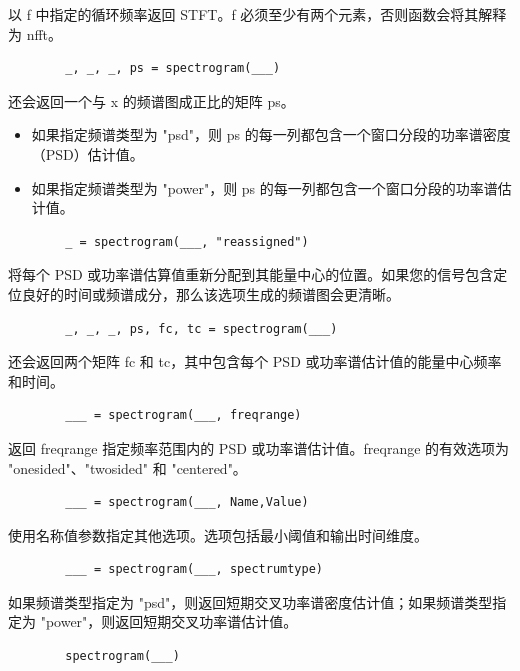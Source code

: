 \documentclass{article}
\begin{document}
	以 f 中指定的循环频率返回 STFT。f 必须至少有两个元素，否则函数会将其解释为 nfft。
	
	\begin{verbatim}
		_, _, _, ps = spectrogram(___)
	\end{verbatim}
	
	还会返回一个与 x 的频谱图成正比的矩阵 ps。
	
	\begin{itemize}
		\item 如果指定频谱类型为 "psd"，则 ps 的每一列都包含一个窗口分段的功率谱密度（PSD）估计值。
		
		\item 如果指定频谱类型为 "power"，则 ps 的每一列都包含一个窗口分段的功率谱估计值。
	\end{itemize}	
	
	
	\begin{verbatim}
		_ = spectrogram(___, "reassigned")
	\end{verbatim}
	
	将每个 PSD 或功率谱估算值重新分配到其能量中心的位置。如果您的信号包含定位良好的时间或频谱成分，那么该选项生成的频谱图会更清晰。
	
	\begin{verbatim}
		_, _, _, ps, fc, tc = spectrogram(___)
	\end{verbatim}
	
	还会返回两个矩阵 fc 和 tc，其中包含每个 PSD 或功率谱估计值的能量中心频率和时间。
	
	\begin{verbatim}
		___ = spectrogram(___, freqrange)
	\end{verbatim}
	
	返回 freqrange 指定频率范围内的 PSD 或功率谱估计值。freqrange 的有效选项为 "onesided"、"twosided" 和 "centered"。

	\begin{verbatim}
		___ = spectrogram(___, Name,Value)
	\end{verbatim}
	
	使用名称值参数指定其他选项。选项包括最小阈值和输出时间维度。
	
	\begin{verbatim}
		___ = spectrogram(___, spectrumtype)
	\end{verbatim}

	如果频谱类型指定为 "psd"，则返回短期交叉功率谱密度估计值；如果频谱类型指定为 "power"，则返回短期交叉功率谱估计值。

	\begin{verbatim}
		spectrogram(___) 
	\end{verbatim}
\end{document}
